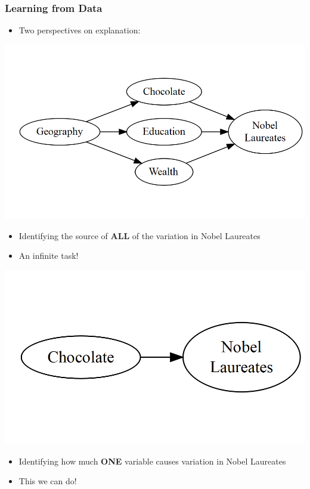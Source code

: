 \documentclass[xcolor=x11names,compress]{beamer}\usepackage[]{graphicx}\usepackage[]{color}
\makeatletter
\def\maxwidth{ %
  \ifdim\Gin@nat@width>\linewidth
    \linewidth
  \else
    \Gin@nat@width
  \fi
}
\newenvironment{knitrout}{}{} %
\renewcommand{\(}{\begin{columns}}
\renewcommand{\)}{\end{columns}}
\newcommand{\<}[1]{\begin{column}{#1}}
\renewcommand{\>}{\end{column}}
\makeatother
\begin{document}
\begin{frame}
\frametitle{Learning from Data}
\begin{itemize}
\item Two perspectives on explanation:
\end{itemize}
\begin{multicols}{2}
\begin{knitrout}
\color{fgcolor}
\includegraphics[width=\maxwidth]{figure/explanation1-1} 

\end{knitrout}
\pause
\begin{itemize}
\item Identifying the source of \textbf{ALL} of the variation in Nobel Laureates
\pause
\item An infinite task!
\end{itemize}
\pause
\columnbreak
\begin{knitrout}
\color{fgcolor}
\includegraphics[width=\maxwidth]{figure/explanation2-1} 

\end{knitrout}
\pause
\begin{itemize}
\item Identifying how much \textbf{ONE} variable causes variation in Nobel Laureates
\pause
\item This we can do!
\end{itemize}
\end{multicols}
\end{frame}
\end{document}
